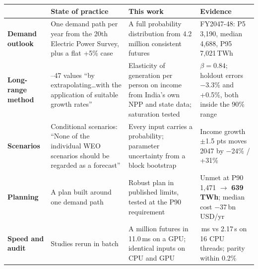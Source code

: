 {\fontsize{7.4}{8.9}\selectfont
\renewcommand{\arraystretch}{1.22}
\setlength{\tabcolsep}{4pt}
\begin{tabular}{@{}>{\raggedright\arraybackslash}p{1.85cm}>{\raggedright\arraybackslash}p{4.0cm}>{\raggedright\arraybackslash}p{4.0cm}>{\raggedright\arraybackslash}p{3.85cm}@{}}
\toprule
& \textbf{\color{muted}State of practice} & \textbf{\color{navy}This work} & \textbf{\color{good}Evidence}\\
\midrule
\textbf{Demand outlook} & One demand path per year from the 20th Electric Power Survey, plus a flat +5\% case \cite{pib_nep_2023,powerline_nep_scenarios_2023}
 & A full probability distribution from 4.2 million consistent futures & FY2047-48: P5 3,190, median 4,688, P95 7,021\,TWh\\
\textbf{Long-range method} & 2036--47 values ``by extrapolating\ldots with the application of suitable growth rates'' \cite{powerline_20th_eps_2022}
 & Elasticity of generation per person on income from India's own NPP and state data; saturation tested \cite{yoo2010electricity,wolfram2012energy} & $\beta = 0.84$; holdout errors $-$3.3\% and +0.5\%, both inside the 90\% range\\
\textbf{Scenarios} & Conditional scenarios: ``None of the individual WEO scenarios should be regarded as a forecast'' \cite{iea_weo_scenarios}
 & Every input carries a probability; parameter uncertainty from a block bootstrap \cite{kunsch1989jackknife} & Income growth $\pm$1.5 pts moves 2047 by $-$24\% / +31\%\\
\textbf{Planning} & A plan built around one demand path \cite{pib_nep_2023}
 & Robust plan in published limits, tested at the P90 requirement \cite{lempert2003shaping} & Unmet at P90 1,471 $\to$ \textbf{639\,TWh}; median cost $-$37\,bn USD/yr\\
\textbf{Speed and audit} & Studies rerun in batch & A million futures in 11.0\,ms on a GPU; identical inputs on CPU and GPU \cite{salmon2011parallel} & 11.0\,ms vs 2.17\,s on 16 CPU threads; parity within 0.2\%\\
\bottomrule
\end{tabular}}
